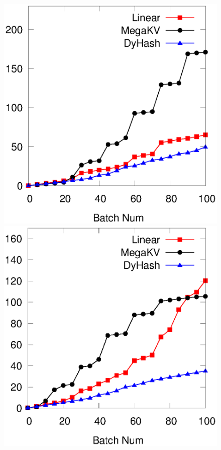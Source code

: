 \begin{figure}[ht]
\begin{minipage}{0.19\linewidth}
		\centerline{\dsreddit}
	\end{minipage}
	\begin{minipage}{0.19\linewidth}\centering
		\includegraphics[width=\linewidth]{pic/dynamic-stability/dynamic-sta-tpch.eps}
		\centerline{\dstpch}
	\end{minipage}
	\begin{minipage}{0.19\linewidth}\centering
		\includegraphics[width=\linewidth]{pic/dynamic-stability/dynamic-sta-ali.eps}

\end{minipage}
\end{figure}
